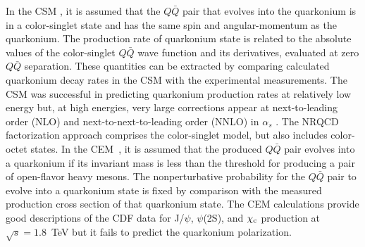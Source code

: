 \documentclass[12pt,a4paper,final]{iopart}
\begin{document}
  In the CSM \cite{Einhorn:1975ua,Ellis:1976fj,Carlson:1976cd,Berger:1980ni},
it is assumed that the $Q\bar Q$ pair that evolves into
the quarkonium is in a color-singlet state and has the same spin
and angular-momentum as the quarkonium. 
 The production rate of quarkonium state is related to 
the absolute values of the color-singlet $Q\bar Q$ wave function and 
its derivatives, evaluated at zero $Q\bar Q$ separation. These quantities 
can be extracted by comparing calculated quarkonium decay
rates in the CSM with the experimental measurements. 
 The CSM was successful in predicting quarkonium production rates at
relatively low energy \cite{Schuler:1994hy} but, at high
energies, very large corrections appear at next-to-leading
order (NLO) and next-to-next-to-leading order (NNLO) in $\alpha_s$
\cite{Artoisenet:2007xi,Campbell:2007ws,Artoisenet:2008fc}.
  The NRQCD factorization approach comprises the color-singlet model, 
but also includes color-octet states.
    In the CEM~\cite{Fritzsch:1977ay,Amundson:1995em,Amundson:1996qr}, it
is assumed that the produced $Q\bar Q$ pair evolves into a quarkonium
if its invariant mass is less than the threshold for producing a 
pair of open-flavor heavy mesons. 
 The nonperturbative probability for the $Q\bar Q$ pair to evolve into 
a quarkonium state is fixed by comparison with the measured production
cross section of that quarkonium state.
 The CEM calculations provide good descriptions of the CDF data for J/$\psi$,
$\psi$(2S), and $\chi_{\rm c}$ production at $\sqrt{s}=1.8$~TeV
\cite{Amundson:1996qr} but it fails to predict the quarkonium 
polarization.
\end{document}
